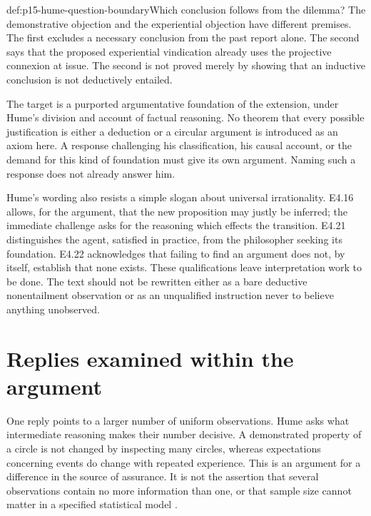 \begin{hbwarning}{def:p15-hume-question-boundary}{Which conclusion follows from the dilemma?}
The demonstrative objection and the experiential objection have different
premises. The first excludes a necessary conclusion from the past report
alone. The second says that the proposed experiential vindication already
uses the projective connexion at issue. The second is not proved merely
by showing that an inductive conclusion is not deductively entailed.

The target is a purported argumentative foundation of the extension, under
Hume's division and account of factual reasoning. No theorem that every
possible justification is either a deduction or a circular argument is
introduced as an axiom here. A response challenging his classification,
his causal account, or the demand for this kind of foundation must give
its own argument. Naming such a response does not already answer him.
\end{hbwarning}

Hume's wording also resists a simple slogan about universal irrationality.
E4.16 allows, for the argument, that the new proposition may justly be
inferred; the immediate challenge asks for the reasoning which effects
the transition. E4.21 distinguishes the agent, satisfied in practice,
from the philosopher seeking its foundation. E4.22 acknowledges that
failing to find an argument does not, by itself, establish that none
exists. These qualifications leave interpretation work to be done.
The text should not be rewritten either as a bare deductive
nonentailment observation or as an unqualified instruction never to
believe anything unobserved.

\section{Replies examined within the argument}
\label{sec:p15-hume-replies}

One reply points to a larger number of uniform observations. Hume asks
what intermediate reasoning makes their number decisive. A demonstrated
property of a circle is not changed by inspecting many circles, whereas
expectations concerning events do change with repeated experience.
This is an argument for a difference in the source of assurance. It is
not the assertion that several observations contain no more information
than one, or that sample size cannot matter in a specified statistical
model \parencite[E~4.20, 5.5]{Hume1777EnquiryHTO}.

